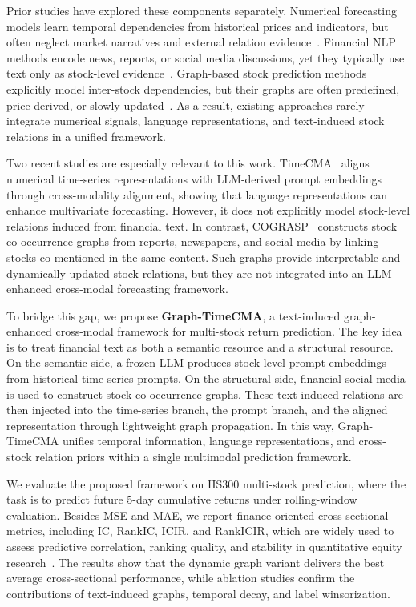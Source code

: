 \documentclass[runningheads]{llncs}
\begin{document}
Prior studies have explored these components separately. Numerical forecasting models learn temporal dependencies from historical prices and indicators, but often neglect market narratives and external relation evidence~\cite{zhou2021informer,wu2021autoformer,nie2022patchtst,liu2023itransformer,wang2024timemixer}. Financial NLP methods encode news, reports, or social media discussions, yet they typically use text only as stock-level evidence~\cite{xu2018stocknet,sawhney2020deep,araci2019finbert,wu2023bloomberggpt,wang2024llmfactor}. Graph-based stock prediction methods explicitly model inter-stock dependencies, but their graphs are often predefined, price-derived, or slowly updated~\cite{xu2021hist,qian2024mdgnn,xia2024cisthpan}. As a result, existing approaches rarely integrate numerical signals, language representations, and text-induced stock relations in a unified framework.

Two recent studies are especially relevant to this work. TimeCMA~\cite{liu2025timecma} aligns numerical time-series representations with LLM-derived prompt embeddings through cross-modality alignment, showing that language representations can enhance multivariate forecasting. However, it does not explicitly model stock-level relations induced from financial text. In contrast, COGRASP~\cite{li2025cograsp} constructs stock co-occurrence graphs from reports, newspapers, and social media by linking stocks co-mentioned in the same content. Such graphs provide interpretable and dynamically updated stock relations, but they are not integrated into an LLM-enhanced cross-modal forecasting framework.

To bridge this gap, we propose \textbf{Graph-TimeCMA}, a text-induced graph-enhanced cross-modal framework for multi-stock return prediction. The key idea is to treat financial text as both a semantic resource and a structural resource. On the semantic side, a frozen LLM produces stock-level prompt embeddings from historical time-series prompts. On the structural side, financial social media is used to construct stock co-occurrence graphs. These text-induced relations are then injected into the time-series branch, the prompt branch, and the aligned representation through lightweight graph propagation. In this way, Graph-TimeCMA unifies temporal information, language representations, and cross-stock relation priors within a single multimodal prediction framework.

We evaluate the proposed framework on HS300 multi-stock prediction, where the task is to predict future 5-day cumulative returns under rolling-window evaluation. Besides MSE and MAE, we report finance-oriented cross-sectional metrics, including IC, RankIC, ICIR, and RankICIR, which are widely used to assess predictive correlation, ranking quality, and stability in quantitative equity research~\cite{grinold2000active}. The results show that the dynamic graph variant delivers the best average cross-sectional performance, while ablation studies confirm the contributions of text-induced graphs, temporal decay, and label winsorization.
\end{document}
